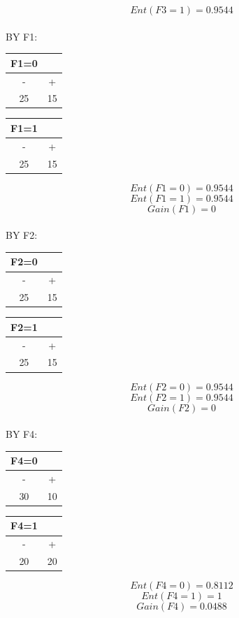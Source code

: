 \documentclass{article}
\begin{document}
\[Ent(F3=1)=0.9544\]
\\BY F1:\\
\begin{center}
    \begin{tabular}{cc}
    F1=0\\
    \hline
    -&+\\
    \hline
    25&15\\
    \hline
\end{tabular}
\begin{tabular}{cc}
    F1=1\\
    \hline
    -&+\\
    \hline
    25&15\\
    \hline
\end{tabular}
\end{center}
\[Ent(F1=0)=0.9544\]
\[Ent(F1=1)=0.9544\]
\[Gain(F1)=0\]
\\BY F2:\\
\begin{center}
    \begin{tabular}{cc}
    F2=0\\
    \hline
    -&+\\
    \hline
    25&15\\
    \hline
\end{tabular}
\begin{tabular}{cc}
    F2=1\\
    \hline
    -&+\\
    \hline
    25&15\\
    \hline
\end{tabular}
\end{center}
\[Ent(F2=0)=0.9544\]
\[Ent(F2=1)=0.9544\]
\[Gain(F2)=0\]
\\BY F4:\\
\begin{center}
    \begin{tabular}{cc}
    F4=0\\
    \hline
    -&+\\
    \hline
    30&10\\
    \hline
\end{tabular}
\begin{tabular}{cc}
    F4=1\\
    \hline
    -&+\\
    \hline
    20&20\\
    \hline
\end{tabular}
\end{center}
\[Ent(F4=0)=0.8112\]
\[Ent(F4=1)=1\]
\[Gain(F4)=0.0488\]
\end{document}
